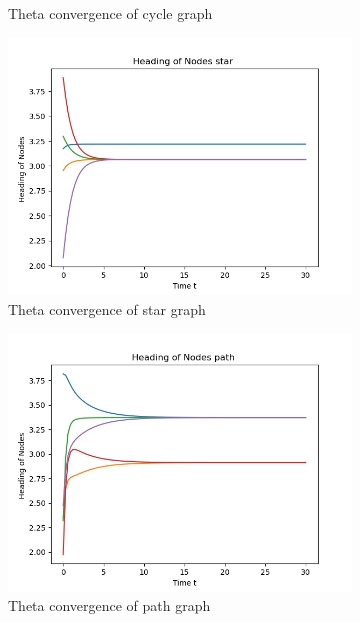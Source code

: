 \documentclass{article}
\begin{document}
\begin{problem}
\begin{figure}[!h]
\begin{subfigure}{0.35\textwidth}
            \caption{Theta convergence of cycle graph }
        \end{subfigure}
        \begin{subfigure}{0.35\textwidth}
            \includegraphics[width=\textwidth]{./img/p3_star0.png}
            \caption{Theta convergence of star graph }
        \end{subfigure}
        \begin{subfigure}{0.35\textwidth}
            \includegraphics[width=\textwidth]{./img/p3_path0.png}
            \caption{Theta convergence of path graph }
        \end{subfigure}
        \begin{subfigure}{0.35\textwidth}

\end{subfigure}
\end{figure}
\end{problem}
\end{document}
